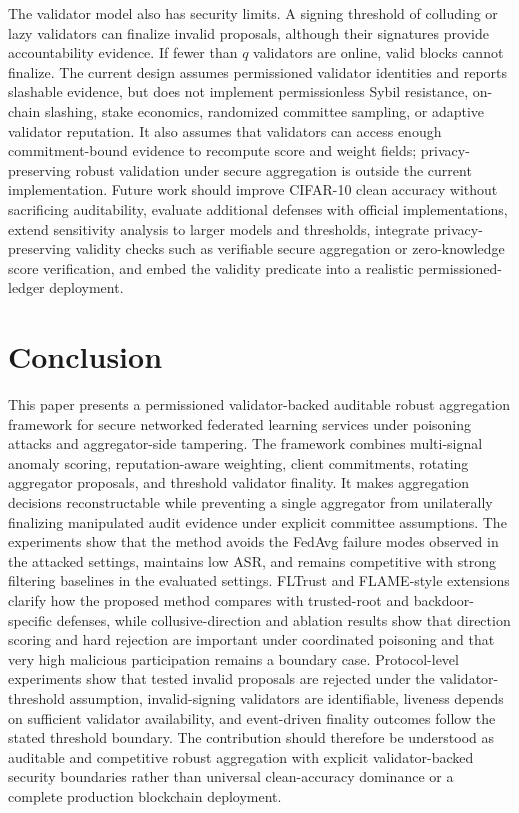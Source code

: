 \documentclass[preprint,12pt]{elsarticle}
\begin{document}
The validator model also has security limits. A signing threshold of colluding or lazy validators can finalize invalid proposals, although their signatures provide accountability evidence. If fewer than $q$ validators are online, valid blocks cannot finalize. The current design assumes permissioned validator identities and reports slashable evidence, but does not implement permissionless Sybil resistance, on-chain slashing, stake economics, randomized committee sampling, or adaptive validator reputation. It also assumes that validators can access enough commitment-bound evidence to recompute score and weight fields; privacy-preserving robust validation under secure aggregation is outside the current implementation. Future work should improve CIFAR-10 clean accuracy without sacrificing auditability, evaluate additional defenses with official implementations, extend sensitivity analysis to larger models and thresholds, integrate privacy-preserving validity checks such as verifiable secure aggregation or zero-knowledge score verification, and embed the validity predicate into a realistic permissioned-ledger deployment.

\section{Conclusion}

This paper presents a permissioned validator-backed auditable robust aggregation framework for secure networked federated learning services under poisoning attacks and aggregator-side tampering. The framework combines multi-signal anomaly scoring, reputation-aware weighting, client commitments, rotating aggregator proposals, and threshold validator finality. It makes aggregation decisions reconstructable while preventing a single aggregator from unilaterally finalizing manipulated audit evidence under explicit committee assumptions. The experiments show that the method avoids the FedAvg failure modes observed in the attacked settings, maintains low ASR, and remains competitive with strong filtering baselines in the evaluated settings. FLTrust and FLAME-style extensions clarify how the proposed method compares with trusted-root and backdoor-specific defenses, while collusive-direction and ablation results show that direction scoring and hard rejection are important under coordinated poisoning and that very high malicious participation remains a boundary case. Protocol-level experiments show that tested invalid proposals are rejected under the validator-threshold assumption, invalid-signing validators are identifiable, liveness depends on sufficient validator availability, and event-driven finality outcomes follow the stated threshold boundary. The contribution should therefore be understood as auditable and competitive robust aggregation with explicit validator-backed security boundaries rather than universal clean-accuracy dominance or a complete production blockchain deployment.
\end{document}
